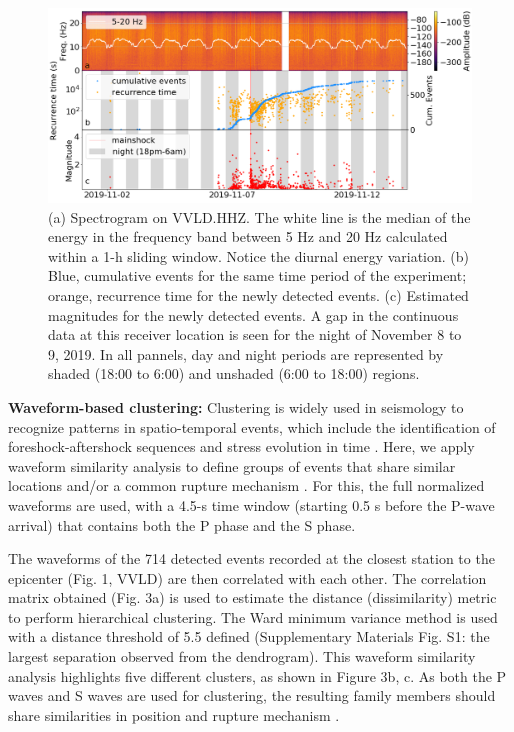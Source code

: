 \documentclass[a4paper,12pt,twoside]{article}
\begin{document}
\begin{figure}
    \centering
     \includegraphics[width=1\linewidth]{spec_rec_mag.png}    
\caption{(a) Spectrogram on VVLD.HHZ. The white line is the median of the energy in the frequency band between 5 Hz and 20 Hz calculated within a 1-h sliding window. Notice the diurnal energy variation. (b) Blue, cumulative events for the same time period of the experiment; orange, recurrence time for the newly detected events. (c) Estimated magnitudes for the newly detected events. A gap in the continuous data at this receiver location is seen for the night of November 8 to 9, 2019. In all pannels, day and night periods are represented by shaded (18:00 to 6:00) and unshaded (6:00 to 18:00) regions.}
\end{figure}    \label{fig:spectrum}


{\bf Waveform-based clustering:} Clustering is widely used in seismology to recognize patterns in spatio-temporal events, which include the identification of foreshock-aftershock sequences and stress evolution in time \citep[\emph{e.g.},][]{Kagan_1991_LTE, wehling_2013_IDT, Cesca_2014_SMC, Ellsworth_2018_NIE}. Here, we apply waveform similarity analysis \citep{Cattaneo_1999_WSA} to define groups of events that share similar locations and/or a common rupture mechanism \citep{Kagan_1991_LTE, wehling_2013_IDT, Cesca_2014_SMC, Ellsworth_2018_NIE, Cattaneo_1999_WSA}. For this, the full normalized waveforms are used, with a 4.5-s time window (starting 0.5 s before the P-wave arrival) that contains both the P phase and the S phase. 

The waveforms of the 714 detected events recorded at the closest station to the epicenter (Fig. 1, VVLD) are then correlated with each other. The correlation matrix obtained (Fig. 3a) is used to estimate the distance (dissimilarity) metric to perform hierarchical clustering. The Ward minimum variance method is used \citep{Ward_1963_HGO} with  a distance threshold of 5.5 defined (Supplementary Materials Fig. S1: the largest separation observed from the dendrogram). This waveform similarity analysis highlights five different clusters, as shown in Figure 3b, c. As both the P waves and S waves are used for clustering, the resulting family members should share similarities in position and rupture mechanism \citep{Kagan_1991_LTE, wehling_2013_IDT, Cesca_2014_SMC, Ellsworth_2018_NIE, Cattaneo_1999_WSA}.
\end{document}
